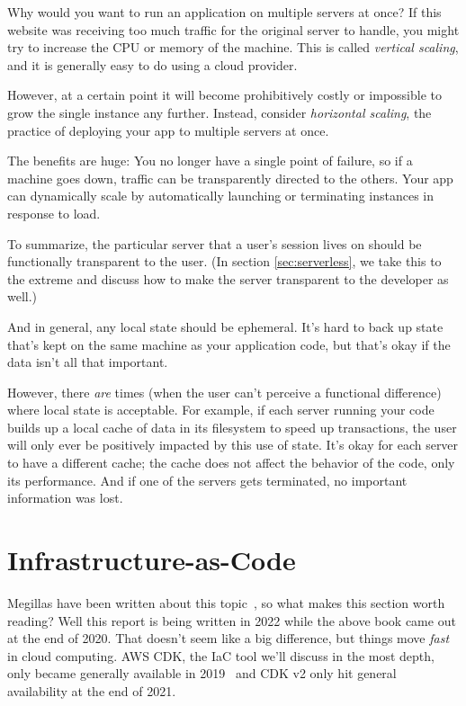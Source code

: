\documentclass{article}
\newcommand{\infobox}[2]{
  \begin{tcolorbox}[width=\textwidth,colback={white},title={\strut\textbf{#1}},colbacktitle=blue!15,coltitle=black,boxrule=0.2pt,parbox=false]
    #2
  \end{tcolorbox}
}
\newcommand{\noterm}[1]{\textit{#1}}
\newcommand{\term}[1]{\noterm{#1}\index{#1}}
\begin{document}
\infobox{Horizontal scaling}{
  Why would you want to run an application on multiple servers at once?
  If this website was receiving too much traffic for the original server to handle, you might try to increase the CPU or memory of the machine.
  This is called \term{vertical scaling}, and it is generally easy to do using a cloud provider.

  However, at a certain point it will become prohibitively costly or impossible to grow the single instance any further.
  Instead, consider \term{horizontal scaling}, the practice of deploying your app to multiple servers at once.

  The benefits are huge:
  You no longer have a single point of failure, so if a machine goes down, traffic can be transparently directed to the others.
  Your app can dynamically scale by automatically launching or terminating instances in response to load.
}

To summarize, the particular server that a user's session lives on should be functionally transparent to the user.
(In section \ref{sec:serverless}, we take this to the extreme and discuss how to make the server transparent to the developer as well.)

And in general, any local state should be ephemeral.
It's hard to back up state that's kept on the same machine as your application code, but that's okay if the data isn't all that important.

However, there \textit{are} times (when the user can't perceive a functional difference) where local state is acceptable.
For example, if each server running your code builds up a local cache of data in its filesystem to speed up transactions, the user will only ever be positively impacted by this use of state.
It's okay for each server to have a different cache; the cache does not affect the behavior of the code, only its performance.
And if one of the servers gets terminated, no important information was lost.

\section{Infrastructure-as-Code}
\label{IAC}

Megillas have been written about this topic~\cite{iac-book}, so what makes this section worth reading?
Well this report is being written in 2022 while the above book came out at the end of 2020.
That doesn't seem like a big difference, but things move \textit{fast} in cloud computing.
AWS CDK, the IaC tool we'll discuss in the most depth, only became generally available in 2019~\cite{cdk-1} and CDK v2 only hit general availability at the end of 2021.~\cite{cdk-2}
\end{document}
